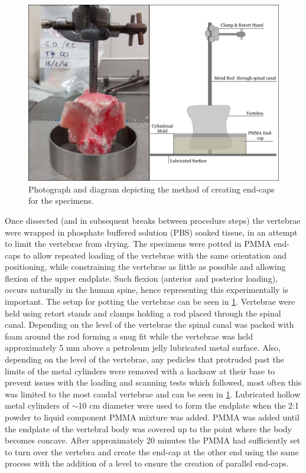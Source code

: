 \begin{figure}[ht!]
\centering
\includegraphics[width=5in]{images/potting_vertebra.png}
\caption{Photograph and diagram depicting the method of creating end-caps for the specimens.}
\label{fig:potting_vertebra}
\end{figure}



Once dissected (and in subsequent breaks between procedure steps) the vertebrae
were wrapped in phosphate buffered solution (PBS) soaked tissue, in an attempt
to limit the vertebrae from drying.  The specimens were potted in PMMA end-caps
to allow repeated loading of the vertebrae with the same orientation and
positioning, while constraining the vertebrae as little as possible and
allowing flexion of the upper endplate.  Such flexion (anterior and posterior
loading), occurs naturally in the human spine, hence representing this
experimentally is important.  The setup for potting the vertebrae can be seen
in \cref{fig:potting_vertebra}.  Vertebrae were held using retort stands and
clamps holding a rod placed through the spinal canal. Depending on the level of
the vertebrae the spinal canal was packed with foam around the rod forming a
snug fit while the vertebrae was held approximately 5 mm above a petroleum
jelly lubricated metal surface. Also, depending on the level of the vertebrae,
any pedicles that protruded past the limits of the metal cylinders were removed
with a hacksaw at their base to prevent issues with the loading and scanning
tests which followed, most often this was limited to the most caudal vertebrae
and can be seen in \cref{fig:potting_vertebra}. Lubricated hollow metal
cylinders of \(\sim\)10 cm diameter were used to form the endplate when the 2:1
powder to liquid component PMMA mixture was added. PMMA was added until the
endplate of the vertebral body was covered up to the point where the body
becomes concave. After approximately 20 minutes the PMMA had sufficiently set
to turn over the vertebra and create the end-cap at the other end using the
same process with the addition of a level to ensure the creation of parallel
end-caps.

